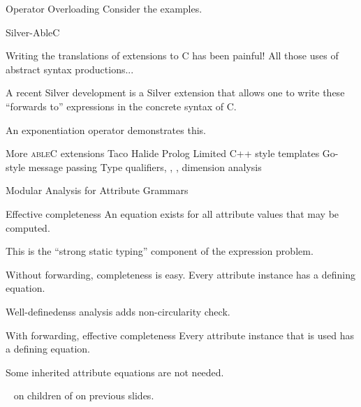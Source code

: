 \documentclass[notes,11pt,aspectratio=169]{beamer}
\newcommand{\egreen}[1]{{\usebeamercolor[fg]{greencolor}#1}}
\newcommand{\ableC}{\textsc{ableC}}
\begin{document}
\begin{frame}{Operator Overloading}
Consider the 
examples.

\end{frame}




\begin{frame}{Silver-AbleC}

Writing the translations of extensions to C has been painful!
\bi
\x All those uses of abstract syntax productions...
\ei

\bigskip
A recent Silver development is a Silver extension that allows one to
write these ``forwards to'' expressions in the concrete syntax of C.

\bigskip
An exponentiation operator demonstrates this.
\end{frame}


\begin{frame}{More \ableC{} extensions}
\biA
\x Taco
\x Halide
\x Prolog
\x Limited C++ style templates
\x Go-style message passing
\x Type qualifiers, \eg{} , , dimension
   analysis
\ei
{}
\end{frame}


\begin{frame}{Modular Analysis for Attribute Grammars}
\end{frame}


\begin{frame}[t]{Effective completeness}
\egreen{An equation exists for all attribute values that may be computed.}

\bigskip
This is the ``strong static typing'' component of the expression problem.

\bigskip
Without forwarding, completeness is easy.
 \bi
  \x Every attribute instance has a defining equation.

  \x Well-definedenss analysis adds non-circularity check.
 \ei


\bigskip
With forwarding, effective completeness
 \bi
  \x Every attribute instance that is used has a defining equation.

  \x Some inherited attribute equations are not needed.

  \x \eg\  on children of  on previous slides.
 \ei
\end{frame}
\end{document}
